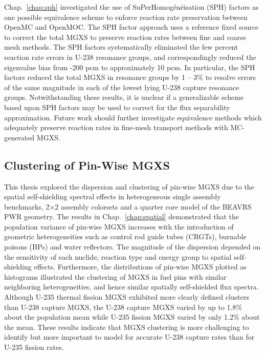 Chap.~\ref{chap:sph} investigated the use of SuPerHomog\'{e}n\'{e}isation (SPH) factors as one possible equivalence scheme to enforce reaction rate preservation between OpenMC and OpenMOC. The \ac{SPH} factor approach uses a reference fixed source to correct the total \ac{MGXS} to preserve reaction rates between fine and coarse mesh methods. The \ac{SPH} factors systematically eliminated the few percent reaction rate errors in U-238 resonance groups, and correspondingly reduced the eigenvalue bias from -200 \ac{pcm} to approximately 10 \ac{pcm}. In particular, the \ac{SPH} factors reduced the total \ac{MGXS} in resonance groups by 1 -- 3\% to resolve errors of the same magnitude in each of the lowest lying U-238 capture resonance groups. Notwithstanding these results, it is unclear if a generalizable scheme based upon \ac{SPH} factors may be used to correct for the flux separability approximation. Future work should further investigate equivalence methods which adequately preserve reaction rates in fine-mesh transport methods with \ac{MC}-generated \ac{MGXS}.


\subsection{Clustering of Pin-Wise MGXS}
\label{subsec:chap12-mgxs-clustering}

This thesis explored the dispersion and clustering of pin-wise \ac{MGXS} due to the spatial self-shielding spectral effects in heterogeneous single assembly benchmarks, 2$\times$2 assembly colorsets and a quarter core model of the \ac{BEAVRS} \ac{PWR} geometry. The results in Chap.~\ref{chap:spatial} demonstrated that the population variance of pin-wise \ac{MGXS} increases with the introduction of geometric heterogeneities such as control rod guide tubes (CRGTs), burnable poisons (BPs) and water reflectors. The magnitude of the dispersion depended on the sensitivity of each nuclide, reaction type and energy group to spatial self-shielding effects. Furthermore, the distributions of pin-wise \ac{MGXS} plotted as histograms illustrated the clustering of \ac{MGXS} in fuel pins with similar neighboring heterogeneities, and hence similar spatially self-shielded flux spectra. Although U-235 thermal fission \ac{MGXS} exhibited more clearly defined clusters than U-238 capture \ac{MGXS}, the U-238 capture \ac{MGXS} varied by up to 1.8\% about the population mean while U-235 fission \ac{MGXS} varied by only 1.2\% about the mean. These results indicate that \ac{MGXS} clustering is more challenging to identify but more important to model for accurate U-238 capture rates than for U-235 fission rates.

